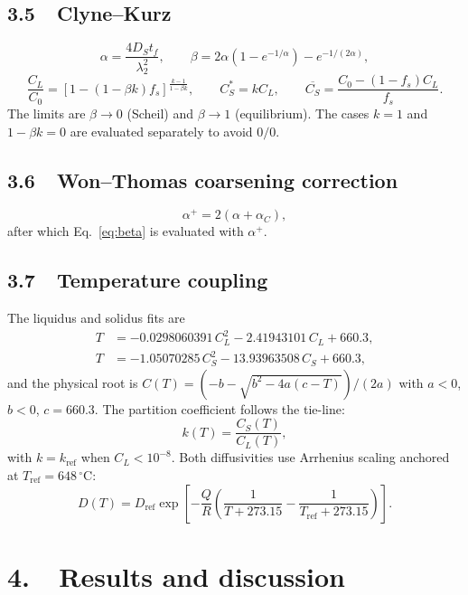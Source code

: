 \documentclass[11pt,a4paper]{article}
\begin{document}
\subsection*{3.5\ \ Clyne--Kurz}
\begin{equation}
\alpha=\frac{4D_St_f}{\lambda_2^2},
\qquad
\beta=2\alpha\left(1-e^{-1/\alpha}\right)-e^{-1/(2\alpha)},
\label{eq:beta}
\end{equation}
\begin{equation}
\frac{C_L}{C_0}=\left[1-(1-\beta k)f_s\right]^{\frac{k-1}{1-\beta k}},
\qquad
C_S^*=kC_L,
\qquad
\overline{C_S}=\frac{C_0-(1-f_s)C_L}{f_s}.
\label{eq:ck}
\end{equation}
The limits are $\beta\to0$ (Scheil) and $\beta\to1$ (equilibrium). The cases
$k=1$ and $1-\beta k=0$ are evaluated separately to avoid $0/0$.

\subsection*{3.6\ \ Won--Thomas coarsening correction}
\begin{equation}
\alpha^{+}=2\left(\alpha+\alpha_C\right),
\label{eq:wt}
\end{equation}
after which Eq.~\eqref{eq:beta} is evaluated with $\alpha^{+}$.

\subsection*{3.7\ \ Temperature coupling}
The liquidus and solidus fits are
\begin{align}
T&=-0.0298060391\,C_L^2-2.41943101\,C_L+660.3,\\
T&=-1.05070285\,C_S^2-13.93963508\,C_S+660.3,
\end{align}
and the physical root is $C(T)=(-b-\sqrt{b^2-4a(c-T)})/(2a)$ with $a<0$,
$b<0$, $c=660.3$. The partition coefficient follows the tie-line:
\begin{equation}
k(T)=\frac{C_S(T)}{C_L(T)},
\label{eq:kT}
\end{equation}
with $k=k_{\text{ref}}$ when $C_L<10^{-8}$. Both diffusivities use Arrhenius
scaling anchored at $T_{\text{ref}}=648\,^\circ$C:
\begin{equation}
D(T)=D_{\text{ref}}\exp\!\left[-\frac{Q}{R}
\left(\frac{1}{T+273.15}-\frac{1}{T_{\text{ref}}+273.15}\right)\right].
\label{eq:arrhenius}
\end{equation}

\section*{4.\ \ Results and discussion}
\end{document}

